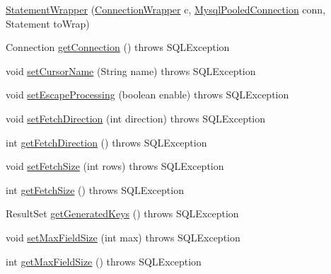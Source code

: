 \begin{DoxyCompactItemize}
\item 
\mbox{\hyperlink{classcom_1_1mysql_1_1cj_1_1jdbc_1_1_statement_wrapper_aa2cfcaa026fa0f9eb6ddca4c1bc52020}{Statement\+Wrapper}} (\mbox{\hyperlink{classcom_1_1mysql_1_1cj_1_1jdbc_1_1_connection_wrapper}{Connection\+Wrapper}} c, \mbox{\hyperlink{classcom_1_1mysql_1_1cj_1_1jdbc_1_1_mysql_pooled_connection}{Mysql\+Pooled\+Connection}} conn, Statement to\+Wrap)
\item 
Connection \mbox{\hyperlink{classcom_1_1mysql_1_1cj_1_1jdbc_1_1_statement_wrapper_a54b29008c1d16899aed0eced88bc3b03}{get\+Connection}} ()  throws S\+Q\+L\+Exception 
\item 
void \mbox{\hyperlink{classcom_1_1mysql_1_1cj_1_1jdbc_1_1_statement_wrapper_aadab86bfdd8ac651097511c9327d3759}{set\+Cursor\+Name}} (String name)  throws S\+Q\+L\+Exception 
\item 
void \mbox{\hyperlink{classcom_1_1mysql_1_1cj_1_1jdbc_1_1_statement_wrapper_a81c989230962ecc24bae061eff8f40b2}{set\+Escape\+Processing}} (boolean enable)  throws S\+Q\+L\+Exception 
\item 
void \mbox{\hyperlink{classcom_1_1mysql_1_1cj_1_1jdbc_1_1_statement_wrapper_a704f44ee7f0f52e1b8ba062c4976f0d0}{set\+Fetch\+Direction}} (int direction)  throws S\+Q\+L\+Exception 
\item 
int \mbox{\hyperlink{classcom_1_1mysql_1_1cj_1_1jdbc_1_1_statement_wrapper_a7cd6eecb504f2103e3e540d1c454a440}{get\+Fetch\+Direction}} ()  throws S\+Q\+L\+Exception 
\item 
void \mbox{\hyperlink{classcom_1_1mysql_1_1cj_1_1jdbc_1_1_statement_wrapper_afb455ca9a9486964c48b10e70e2f8b84}{set\+Fetch\+Size}} (int rows)  throws S\+Q\+L\+Exception 
\item 
int \mbox{\hyperlink{classcom_1_1mysql_1_1cj_1_1jdbc_1_1_statement_wrapper_a708924923e6a232389c880acb31b6c90}{get\+Fetch\+Size}} ()  throws S\+Q\+L\+Exception 
\item 
Result\+Set \mbox{\hyperlink{classcom_1_1mysql_1_1cj_1_1jdbc_1_1_statement_wrapper_a8aa26b3673b2f5b4a312cb8bb28c9f3b}{get\+Generated\+Keys}} ()  throws S\+Q\+L\+Exception 
\item 
void \mbox{\hyperlink{classcom_1_1mysql_1_1cj_1_1jdbc_1_1_statement_wrapper_aa1d8fbcb6d13390a8d7bf3cd9cec3b85}{set\+Max\+Field\+Size}} (int max)  throws S\+Q\+L\+Exception 
\item 
int \mbox{\hyperlink{classcom_1_1mysql_1_1cj_1_1jdbc_1_1_statement_wrapper_ac3faa33afc9f710c2179b446831389c1}{get\+Max\+Field\+Size}} ()  throws S\+Q\+L\+Exception 

\end{DoxyCompactItemize}
